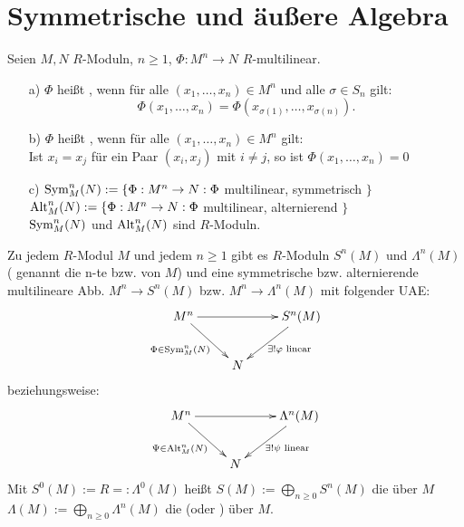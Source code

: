 \documentclass[a4paper, 10pt]{report}
\begin{document}
\section{Symmetrische und äußere Algebra}

 \begin{Def} Seien $M,N$ $R$-Moduln, $n \geq 1$, $\Phi: M^n \rightarrow N$ $R$-multilinear.
  \begin{enumerate}
   \item[ a) ] $\Phi$ hei\ss t , wenn für alle $(x_1, \dots, x_n ) \in M^n$ und alle $\sigma \in S_n$ gilt:
    \[
    \Phi(x_1, \dots , x_n) = \Phi( x_{\sigma(1)},  \dots, x_{\sigma(n)}).
    \]
   \item[ b) ] $\Phi$ heißt , wenn für alle $(x_1, \dots, x_n ) \in M^n$ gilt:\\
    Ist $x_i = x_j$ für ein Paar $(x_i,x_j)$ mit $i \neq j$, so ist $\Phi(x_1, \dots , x_n) = 0$
   \item[ c) ] $\mathrm{Sym}_{M}^{n}(N) := \{ \Phi: M^n \rightarrow N: \Phi$ multilinear, symmetrisch $\}$\\
    $\mathrm{Alt}_{M}^{n}(N) := \{ \Phi: M^n \rightarrow N: \Phi$ multilinear, alternierend $\}$\\
	 $\mathrm{Sym}_{M}^{n}(N)$ und  $\mathrm{Alt}_{M}^{n}(N)$ sind $R$-Moduln.
  \end{enumerate}
 \end{Def}
 \begin{Satz} Zu jedem $R$-Modul $M$ und jedem $n \geq 1$ gibt es $R$-Moduln $S^n(M)$ und $\Lambda^n(M)$ ( genannt die n-te  bzw.  von $M$)
  und eine symmetrische bzw. alternierende multilineare Abb. $M^n \rightarrow S^n(M)$ bzw.  $M^n \rightarrow \Lambda ^n(M)$ mit folgender UAE:
\[
\begin{xy}
  \xymatrix{
      M^n \ar[rr] \ar[rd]_{\Phi\in \Sym{M}{n}{N}}  &     &  S^n(M) \ar[dl]^{\exists!\varphi\text{\ linear}}  \\
                             &  N  &
  }
\end{xy}
\]
beziehungsweise:
\[
\begin{xy}
  \xymatrix{
      M^n \ar[rr] \ar[rd]_{\Psi\in \Alt{M}{n}{N}}  &     &  \Lambda^n(M) \ar[dl]^{\exists!\psi\text{\ linear}}  \\
                             &  N  &
  }
\end{xy}
\]
  Mit $S^0(M) := R =: \Lambda^0(M)$ heißt $S(M):= \bigoplus_{n\geq 0} S^n(M)$ die  über $M$\\
  $\Lambda (M) := \bigoplus_{n\geq 0} \Lambda^n(M)$ die  (oder ) über $M$.
 \end{Satz}
 
\end{document}
